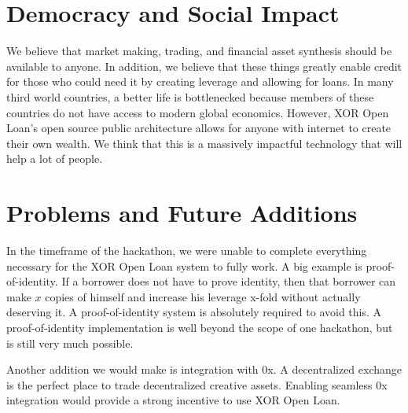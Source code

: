 \documentclass[twoside]{article}
\begin{document}
\section{Democracy and Social Impact}
We believe that market making, trading, and financial asset synthesis should be available to anyone. In addition, we believe that these things greatly enable credit for those who could need it by creating leverage and allowing for loans. In many third world countries, a better life is bottlenecked because members of these countries do not have access to modern global economics. However, XOR Open Loan's open source public architecture allows for anyone with internet to create their own wealth. We think that this is a massively impactful technology that will help a lot of people. 

\section{Problems and Future Additions}
In the timeframe of the hackathon, we were unable to complete everything necessary for the XOR Open Loan system to fully work. A big example is proof-of-identity. If a borrower does not have to prove identity, then that borrower can make $x$ copies of himself and increase his leverage x-fold without actually deserving it. A proof-of-identity system is absolutely required to avoid this. A proof-of-identity implementation is well beyond the scope of one hackathon, but is still very much possible. 

Another addition we would make is integration with 0x. A decentralized exchange is the perfect place to trade decentralized creative assets. Enabling seamless 0x integration would provide a strong incentive to use XOR Open Loan. 
\end{document}
